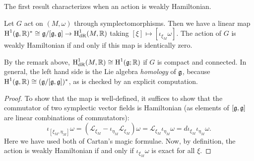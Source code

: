 \documentclass{amsart}
\begin{document}
The first result characterizes when an action is weakly Hamiltonian.
\begin{proposition}
    Let $G$ act on $(M,\omega)$ through symplectomorphisms. Then we have a linear map
    $\operatorname{H}^1(\mathfrak g,\mathbb{R})^*\cong \mathfrak g/[\mathfrak g, \mathfrak g]\to \operatorname{H}^1_\textrm{dR}(M,\mathbb{R})$ taking $[\xi]\mapsto[\iota_{\xi_M}\omega]$.
    The action of $G$ is weakly Hamiltonian if and only if this map is identically zero.
\end{proposition}
By the remark above, $\operatorname{H}^1_\textrm{dR}(M,\mathbb{R})\cong \operatorname{H}^1(\mathfrak g;\mathbb{R})$ if $G$ is compact and connected.
In general, the left hand side is the Lie algebra \textit{homology} of $\mathfrak g$, because
$\operatorname{H}^1(\mathfrak g,\mathbb{R})\cong (\mathfrak g/[\mathfrak g,\mathfrak g])^*$, as is checked by an explicit computation.

\begin{proof}
    To show that the map is well-defined, it suffices to show that the commutator of
    two symplectic vector fields is Hamiltonian (as elements of $[\mathfrak g, \mathfrak g]$ are
    linear combinations of commutators):
    \begin{equation*}
        \iota_{[\xi_M,\eta_M]}\omega = (\mathcal{L}_{\xi_M}-\iota_{\eta_M}\mathcal{L}_{\xi_M}) \omega= \mathcal{L}_{\xi_M}\iota_{\eta_M}\omega=d\iota_{\xi_M}\iota_{\eta_M}\omega.
    \end{equation*}
    Here we have used both of Cartan's magic formulae. Now, by definition, the action
    is weakly Hamiltonian if and only if $\iota_{\xi_M}\omega$ is exact for all $\xi$.
\end{proof}
\end{document}
